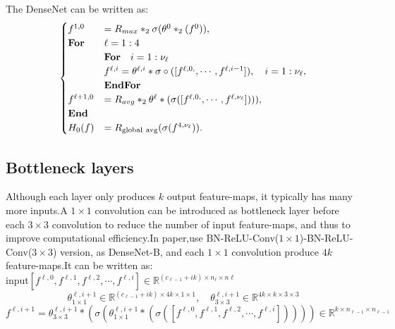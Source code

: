 The DenseNet can be written as:%
\begin{equation}\label{eq:densenet}
\begin{cases}
f^{1,0} &=R_{max} \ast_2 \sigma(\theta^{0} \ast_2 (f^0)), \\
\text{\bf For} &\ell = 1:4 \\
\quad &\text{\bf For} \quad i = 1:\nu_\ell \\
&f^{\ell,i} = \theta^{\ell,i}\ast \sigma \circ ([f^{\ell,0,}, \cdots, f^{\ell,i-1}]), \quad i = 1:\nu_\ell ,\\
\quad &\text{\bf EndFor} \\
f^{\ell+1,0} &=  R_{avg} \ast_2 \theta^{\ell} \ast (\sigma([f^{\ell,0,}, \cdots, f^{\ell,\nu_\ell}])) ) , \\
\text{\bf End} &\\
H_0(f) &=  R_{\rm global~avg}(\sigma(f^{4,\nu_\ell})). \\
\end{cases}
\end{equation}

\subsection{Bottleneck layers}
Although each layer only produces $k$ output feature-maps, it typically has many more inputs.A $1\times 1$ convolution can be introduced as bottleneck layer before each $3\times 3$ convolution to reduce the number of input feature-maps, and thus to improve computational efficiency.In paper,use BN-ReLU-Conv($1\times 1$)-BN-ReLU-Conv($3\times 3$) version, as DenseNet-B, and  each $1\times 1$ convolution produce $4k$ feature-maps.It can be written as:\\

input$[f^{\ell,0},f^{\ell,1},f^{\ell,2},\cdots,f^{\ell,i}] \in \mathbb{R}^{(c_{\ell-1}+ik)\times n_{\ell}\times n{\ell}}$
$$\theta^{\ell,i+1}_{1\times 1} \in \mathbb{R}^{(c_{\ell-1}+ik)\times 4k\times 1\times 1 },\quad \theta^{\ell,i+1}_{3\times 3} \in \mathbb{R}^{4k\times k\times3\times 3 }$$
$$f^{\ell,i+1}=\theta^{\ell,i+1}_{3\times 3}\ast (\sigma(\theta^{\ell,i+1}_{1\times 1}\ast(\sigma([f^{\ell,0},f^{\ell,1},f^{\ell,2},\cdots,f^{\ell,i}]))))\in\mathbb{R}^{k\times n_{\ell-1}\times n_{\ell-1}}$$
